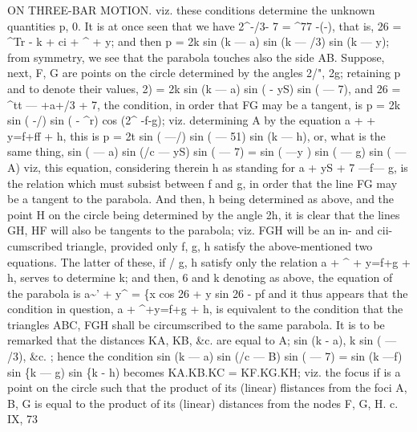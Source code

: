 \documentclass[12pt,a4paper]{article}
\begin{document}
\guillemotright{}
ON THREE-BAR MOTION.
viz.
these
conditions
determine
the unknown
quantities
p,
0.
It
is
at
once
seen
that
we have
2\textasciicircum{}-/3- 7 = \textasciicircum{}77 -(\guillemotleft{}-\guillemotleft{}),
that
is,
26 = \textasciicircum{}Tr - k +
ci + \textasciicircum{} + y;
and then
p = 2k sin (k --- a) sin (k --- /3) sin (k --- y);
from symmetry, we see that the parabola touches
also the
side AB.
Suppose,
next,
F, G
are
points
on
the
circle
determined
by
the
angles
2/",
2g;
retaining p and
to denote
their values,
2) = 2k sin (k --- a) sin (\guillemotleft{} - yS) sin (\guillemotleft{} --- 7), and 26 = \textasciicircum{}tt --- \guillemotleft{}+a+/3 + 7,
the condition,
in order that FG may be a tangent,
is
p = 2k sin (\guillemotleft{} -/) sin (\guillemotleft{} - \textasciicircum{}r) cos (2\textasciicircum{} -f-g);
viz. determining A by the equation
a +
+ y=f+ff + h,
this
is
p = 2t sin (\guillemotleft{} ---/) sin (\guillemotleft{} --- 51) sin (k --- h),
or, what
is the same
thing,
sin (\guillemotleft{} --- a) sin (/c --- yS) sin (\guillemotleft{} --- 7) = sin (\guillemotleft{} ---y ) sin (\guillemotleft{} --- g) sin (\guillemotleft{} --- A)
viz,
this
equation,
considering
therein
h
as
standing
for
a + yS + 7 ---f--- g,
is
the
relation
which
must
subsist
between f and
g,
in
order
that
the
line FG may
be
a
tangent
to
the
parabola.
And
then,
h
being
determined
as
above,
and
the
point H
on
the
circle
being
determined
by
the
angle
2h,
it
is
clear
that
the
lines GH, HF
will
also
be
tangents
to
the
parabola;
viz. FGH
will
be
an
in-
and
cii-cumscribed
triangle,
provided
only f,
g,
h
satisfy
the
above-mentioned
two
equations.
The
latter
of
these,
if /
g, h
satisfy
only
the
relation
a + \textasciicircum{} + y=f+g + h,
serves
to
determine
k;
and
then, 6 and k denoting as above, the equation
of the parabola
is
a\textasciitilde{}' + y\textasciicircum{} = \{x cos 26 + y sin 26 - pf
and
it
thus
appears
that
the
condition
in
question,
a + \textasciicircum{}+y=f+g + h,
is equivalent
to
the
condition
that
the
triangles ABC, FGH
shall
be
circumscribed
to
the
same
parabola.
It
is
to
be
remarked
that
the
distances KA, KB,
\&c.
are
equal
to
A; sin (k - a),
k sin (\guillemotleft{} --- /3), \&c.
;
hence
the condition
sin (k --- a) sin (/c --- B) sin (\guillemotleft{} --- 7) = sin (k ---f) sin \{k --- g) sin \{k - h)
becomes
KA.KB.KC = KF.KG.KH;
viz.
the
focus
if
is
a
point
on
the
circle
such
that
the
product
of
its
(linear)
flistances
from
the
foci
A,
B, G
is
equal
to
the
product
of
its
(linear)
distances
from
the nodes F, G, H.
c.
IX,
73
\end{document}

